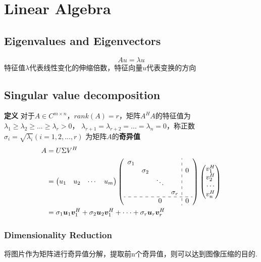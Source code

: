 \chapter{Linear Algebra}

\section{Eigenvalues and Eigenvectors}
\begin{equation}
    Au = \lambda u
\end{equation}
特征值$\lambda$代表线性变化的伸缩倍数，特征向量$u$代表变换的方向

\section{Singular value decomposition}
\textbf{定义} 对于$A \in C^{m \times n}$，$rank(A) = r$，矩阵$A^HA$的特征值为
$\lambda_1 \geqslant \lambda_2 \geqslant ... \geqslant \lambda_r > 0$，
$\lambda_{r+1} = \lambda_{r+2} = ... = \lambda_{n} = 0$，称正数$\sigma_i = \sqrt{\lambda_i}(i = 1,2,...,r) $
为矩阵$A$的\textbf{奇异值}
\\
\begin{equation}
    \begin{split}
        A
        &= U \Sigma V^H \\
        &=
        \begin{pmatrix}
            u_1 & u_2 & \cdots & u_m
        \end{pmatrix}
        \left(
            \begin{array}{cccc:c}
                \sigma_1&           &           &           & \\
                        & \sigma_2  &           &           & 0\\
                        &           & \ddots    &           & \\
                        &           &           & \sigma_r  & \\
                        \hdashline
                        &           & 0         &           & 0
            \end{array}
        \right)
        \begin{pmatrix}
            v_1^H \\
            v_2^H \\
            \cdots \\
            v_n^H
        \end{pmatrix} \\
        &= \sigma_1 \boldsymbol{u}_1 \boldsymbol{v}_1^H + \sigma_2 \boldsymbol{u}_2 \boldsymbol{v}_1^H + \cdot\cdot\cdot + \sigma_r \boldsymbol{u}_r \boldsymbol{v}_r^H
    \end{split}
\end{equation}

\subsection{Dimensionality Reduction}
将图片作为矩阵进行奇异值分解，提取前n个奇异值，则可以达到图像压缩的目的.
